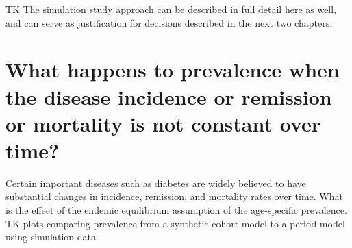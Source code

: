 TK The simulation study approach can be described in full detail here
as well, and can serve as justification for decisions described in the
next two chapters.

\section{What happens to prevalence when the disease incidence or remission or mortality is not constant over time?}

Certain important diseases such as diabetes are widely believed to
have substantial changes in incidence, remission, and mortality rates
over time.  What is the effect of the endemic equilibrium assumption
of the age-specific prevalence. TK plots comparing prevalence from a
synthetic cohort model to a period model using simulation data.

